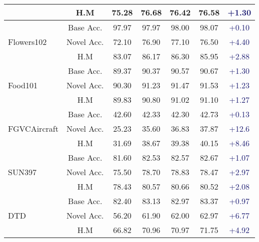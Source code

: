 \documentclass[10pt,twocolumn,letterpaper]{article}
\begin{document}
\begin{center}
\begin{table*}[!t]
{\begin{tabular}{lc|cccc|c}
                               & H.M            & 75.28 & 76.68    & 76.42  &  76.58 & \textcolor{MidnightBlue}{{+1.30}}\\
\midrule
\multirow{3}{*}{Flowers102}    & Base Acc.      & 97.97 & 97.97    & 98.00  &98.07&  \textcolor{MidnightBlue}{{+0.10}}\\
                               & Novel Acc.      & 72.10 & 76.90    & 77.10 &76.50 & \textcolor{MidnightBlue}{{+4.40}}\\
                               & H.M             & 83.07 & 86.17    & 86.30  & 85.95& \textcolor{MidnightBlue}{{+2.88}}\\
\midrule
\multirow{3}{*}{Food101}       & Base Acc.       & 89.37 & 90.37    & {90.57}  &90.67&\textcolor{MidnightBlue}{{+1.30}}\\
                               & Novel Acc.      & 90.30 & 91.23    & 91.47  & 91.53&  \textcolor{MidnightBlue}{{+1.23}}\\
                               & H.M            & 89.83 & 90.80    & 91.02  & 91.10& \textcolor{MidnightBlue}{{+1.27}}\\
\midrule
\multirow{3}{*}{FGVCAircraft}  & Base Acc.       & 42.60 & 42.33    & 42.30 & 42.73  &  \textcolor{MidnightBlue}{{+0.13}}\\
                               & Novel Acc.      & 25.23 & 35.60    & 36.83 &37.87   &  \textcolor{MidnightBlue}{{+12.6}}\\
                               & H.M             & 31.69 & 38.67    & 39.38  & 40.15  &  \textcolor{MidnightBlue}{{+8.46}}\\
\midrule
\multirow{3}{*}{SUN397}        & Base Acc.      & 81.60 & 82.53    &  82.57  &82.67 &   \textcolor{MidnightBlue}{{+1.07}}\\
                               & Novel Acc.      & 75.50 & 78.70    &  78.83 &78.47  &  \textcolor{MidnightBlue}{{+2.97}}\\
                               & H.M            & 78.43 & 80.57    &  80.66 &80.52  &  \textcolor{MidnightBlue}{{+2.08}}\\
\midrule
\multirow{3}{*}{DTD}           & Base Acc.       & 82.40 & 83.13    &82.97 &83.37   &  \textcolor{MidnightBlue}{{+0.97}}\\
                               & Novel Acc.      & 56.20 & 61.90    & 62.00 &62.97  &  \textcolor{MidnightBlue}{{+6.77}}\\
                               & H.M            & 66.82 & 70.96    & 70.97 &71.75  & \textcolor{MidnightBlue}{{+4.92}}\\

\end{tabular}}
\end{table*}
\end{center}
\end{document}
